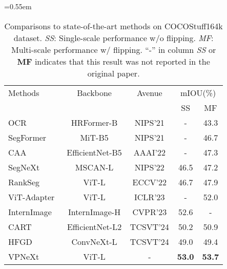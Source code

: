 \begin{table}[th!]
\centering
\small
\caption{
Comparisons to state-of-the-art methods on COCOStuff164k dataset.
%
\textit{SS}: Single-scale performance w/o flipping.
\textit{MF}: Multi-scale performance w/ flipping.
``-'' in column \textit{SS} or \textbf{MF} indicates that this result was not reported in the original paper.
}
\resizebox{\linewidth}{!}
{\def\arraystretch{1} \tabcolsep=0.55em 
\begin{tabular}{l|c|c|c|c}
\toprule%
Methods & Backbone  & Avenue &\multicolumn{2}{c}{mIOU(\%)}\\
& & & SS & MF \\
\midrule
\midrule
OCR~\cite{cOCR,cHRFormer} & HRFormer-B & NIPS'21 & - & 43.3 \\
SegFormer~\cite{cSegFormer} & MiT-B5 & NIPS'21 & - & 46.7 \\
CAA~\cite{cCAA} & EfficientNet-B5 & AAAI'22 & - & 47.3 \\
SegNeXt~\cite{cSegNeXt} & MSCAN-L & NIPS'22 & 46.5 & 47.2 \\
RankSeg~\cite{cRankSeg} & ViT-L & ECCV'22 & 46.7 & 47.9 \\
ViT-Adapter~\cite{cViTAdapter} & ViT-L & ICLR'23 & - & 52.0 \\
InternImage~\cite{cInternImage} &  InternImage-H & CVPR'23 & 52.6 & - \\
CART~\cite{cCART} & EfficientNet-L2 & TCSVT'24 & 50.2 & 50.9 \\
HFGD~\cite{cHFGD} & ConvNeXt-L & TCSVT'24 & 49.0 & 49.4 \\
\midrule
VPNeXt & ViT-L & - & \textbf{53.0} & \textbf{53.7} \\
\bottomrule%
\end{tabular}
}
\label{tab:SOTA-COCOStuff164k}
\end{table}